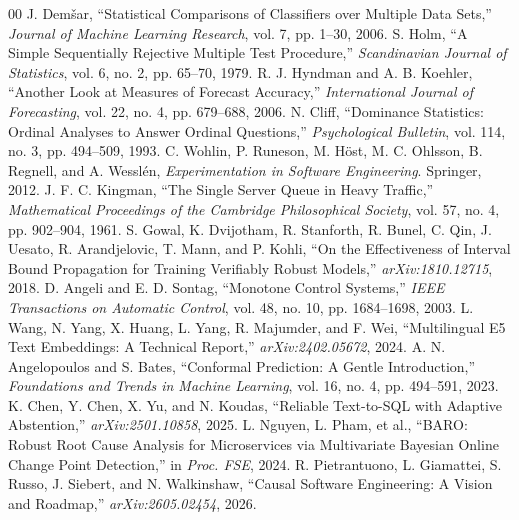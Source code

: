 \documentclass[journal, 10pt]{IEEEtran}
\begin{document}
\begin{thebibliography}{00}
J. Demšar, ``Statistical Comparisons of Classifiers over Multiple Data Sets,'' \emph{Journal of Machine Learning Research}, vol. 7, pp. 1--30, 2006.
S. Holm, ``A Simple Sequentially Rejective Multiple Test Procedure,'' \emph{Scandinavian Journal of Statistics}, vol. 6, no. 2, pp. 65--70, 1979.
R. J. Hyndman and A. B. Koehler, ``Another Look at Measures of Forecast Accuracy,'' \emph{International Journal of Forecasting}, vol. 22, no. 4, pp. 679--688, 2006.
N. Cliff, ``Dominance Statistics: Ordinal Analyses to Answer Ordinal Questions,'' \emph{Psychological Bulletin}, vol. 114, no. 3, pp. 494--509, 1993.
C. Wohlin, P. Runeson, M. Höst, M. C. Ohlsson, B. Regnell, and A. Wesslén, \emph{Experimentation in Software Engineering}. Springer, 2012.
J. F. C. Kingman, ``The Single Server Queue in Heavy Traffic,'' \emph{Mathematical Proceedings of the Cambridge Philosophical Society}, vol. 57, no. 4, pp. 902--904, 1961.
S. Gowal, K. Dvijotham, R. Stanforth, R. Bunel, C. Qin, J. Uesato, R. Arandjelovic, T. Mann, and P. Kohli, ``On the Effectiveness of Interval Bound Propagation for Training Verifiably Robust Models,'' \emph{arXiv:1810.12715}, 2018.
D. Angeli and E. D. Sontag, ``Monotone Control Systems,'' \emph{IEEE Transactions on Automatic Control}, vol. 48, no. 10, pp. 1684--1698, 2003.
L. Wang, N. Yang, X. Huang, L. Yang, R. Majumder, and F. Wei, ``Multilingual E5 Text Embeddings: A Technical Report,'' \emph{arXiv:2402.05672}, 2024.
A. N. Angelopoulos and S. Bates, ``Conformal Prediction: A Gentle Introduction,'' \emph{Foundations and Trends in Machine Learning}, vol. 16, no. 4, pp. 494--591, 2023.
K. Chen, Y. Chen, X. Yu, and N. Koudas, ``Reliable Text-to-SQL with Adaptive Abstention,'' \emph{arXiv:2501.10858}, 2025.
L. Nguyen, L. Pham, et al., ``BARO: Robust Root Cause Analysis for Microservices via Multivariate Bayesian Online Change Point Detection,'' in \emph{Proc. FSE}, 2024.
R. Pietrantuono, L. Giamattei, S. Russo, J. Siebert, and N. Walkinshaw, ``Causal Software Engineering: A Vision and Roadmap,'' \emph{arXiv:2605.02454}, 2026.
\end{thebibliography}
\end{document}
